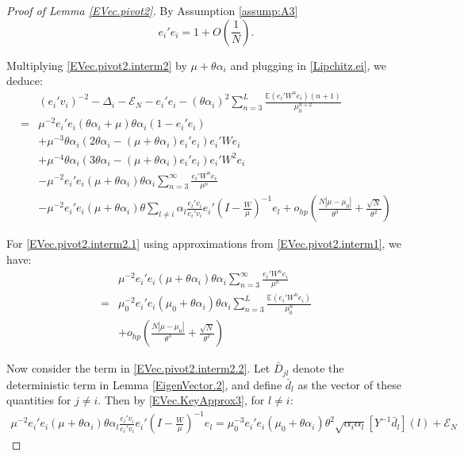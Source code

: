 \documentclass[11pt, reqno]{amsart}
\numberwithin{equation}{section}
\begin{document}
\begin{proof}[Proof of Lemma \ref{EVec.pivot2}]
By Assumption \ref{assump:A3}
\begin{equation}
\label{Lipchitz.ei}
e_i' e_i = 1 + O\left(\frac{1}{N}\right).
\end{equation}

Multiplying \eqref{EVec.pivot2.interm2} by $\mu + \theta\alpha_i$ and plugging in \eqref{Lipchitz.ei}, we deduce:
\begin{align}
\nonumber & (e_i'v_i)^{-2} - \Delta_i - \mathcal{E}_N - e_i'e_i - (\theta\alpha_i)^2 \sum_{n=3}^L \frac{\mathbb E(e_i' W^n e_i)(n+1)}{\mu_0^{n+2}} \\
\nonumber = & \mu^{-2}e_i'e_i(\theta\alpha_i + \mu)\theta\alpha_i(1 - e_i'e_i) \\
&+ \mu^{-3}\theta\alpha_i\left(2\theta\alpha_i  - (\mu + \theta\alpha_i) e_i'e_i \right) e_i'We_i \label{EVec.pivot2.interm2.3}\\
\nonumber &+ \mu^{-4}\theta\alpha_i\left(3\theta\alpha_i - (\mu + \theta\alpha_i) e_i'e_i \right) e_i'W^2e_i \\
&- \mu^{-2}e_i'e_i(\mu + \theta\alpha_i)\theta\alpha_i\sum_{n=3}^\infty \frac{e_i'W^n e_i}{\mu^n}\label{EVec.pivot2.interm2.1}\\
 & \label{EVec.pivot2.interm2.2} - \mu^{-2}e_i'e_i(\mu + \theta\alpha_i)\theta \sum_{l \ne i} \alpha_l \frac{e_l'v_i}{e_i'v_i} e_i'\left(I - \frac{W}{\mu}\right)^{-1} e_l + o_{hp}\left(\frac{N|\mu - \mu_0|}{\theta^3} + \frac{\sqrt{N}}{\theta^2}\right)
\end{align}

For \eqref{EVec.pivot2.interm2.1} using approximations from \eqref{EVec.pivot2.interm1}, we have:
\begin{align*}
\nonumber &\mu^{-2}e_i'e_i(\mu + \theta\alpha_i)\theta\alpha_i \sum_{n=3}^\infty \frac{e_i'W^n e_i}{\mu^n} \\
= & \mu_0^{-2}e_i'e_i(\mu_0 + \theta\alpha_i)\theta\alpha_i \sum_{n=3}^L \frac{\mathbb E(e_i'W^n e_i)}{\mu_0^n} \\
 &+ o_{hp}\left(\frac{N|\mu - \mu_0|}{\theta^3} + \frac{\sqrt{N}}{\theta^2}\right)
\end{align*}

Now consider the term in \eqref{EVec.pivot2.interm2.2}. Let $\bar{D}_{jl}$ denote the deterministic term in Lemma \ref{EigenVector.2}, and define $\bar{d}_l$ as the vector of these quantities for $j \ne i$. Then by \eqref{EVec.KeyApprox3}, for $l \ne i$:
\begin{align}
 \mu^{-2}e_i'e_i(\mu + \theta\alpha_i)\theta \alpha_l \frac{e_l'v_i}{e_i'v_i} e_i'\left(I - \frac{W}{\mu}\right)^{-1}e_l 
\label{EVec.pivot2.interm3} = \mu_0^{-3}e_i'e_i(\mu_0 + \theta\alpha_i)\theta^2\sqrt{\alpha_i \alpha_l} [Y^{-1}\bar{d}_l](l) + \mathcal E_N
\end{align}




\end{proof}
\end{document}

